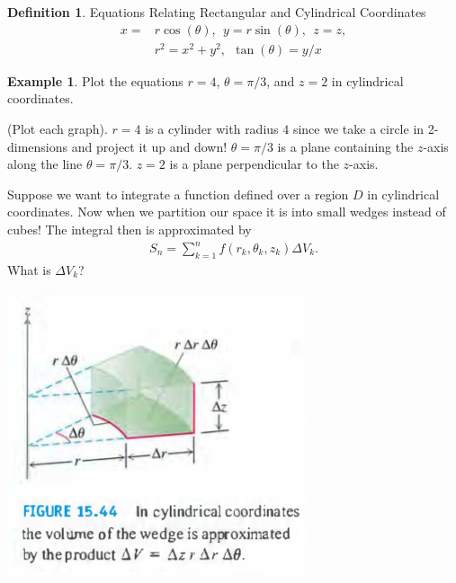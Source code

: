 \documentclass[12pt, letter]{article}
\theoremstyle{plain}
\numberwithin{theorem}{section}
\theoremstyle{definition}
\newtheorem{definition}[theorem]{Definition}
\newtheorem{example}[theorem]{Example}
\begin{document}
\bigskip

\hrulefill

\bigskip

\begin{definition}{Equations Relating Rectangular and Cylindrical Coordinates}
\begin{align*}
x=&r\cos(\theta), \ \ y=r\sin(\theta), \ \ z=z,\\
&r^2=x^2+y^2, \ \ \tan(\theta) = y/x
\end{align*}
\end{definition}

\bigskip

\hrulefill

\bigskip

\begin{example}
Plot the equations $r=4$, $\theta = \pi/3$, and $z=2$ in cylindrical coordinates.

\bigskip

(Plot each graph). $r=4$ is a cylinder with radius $4$ since we take a circle in 2-dimensions and project it up and down! $\theta=\pi/3$ is a plane containing the $z$-axis along the line $\theta=\pi/3$. $z=2$ is a plane perpendicular to the $z$-axis.
\end{example}

\bigskip

\hrulefill

\bigskip

Suppose we want to integrate a function defined over a region $D$ in cylindrical coordinates. Now when we partition our space it is into small wedges instead of cubes! The integral then is approximated by
\begin{align*}
S_n = \sum_{k=1}^n f(r_k,\theta_k, z_k) \Delta V_k.
\end{align*}
What is $\Delta V_k$?

\bigskip

\begin{center}
\includegraphics[scale=0.7]{m3_f19}
\end{center}
\end{document}
